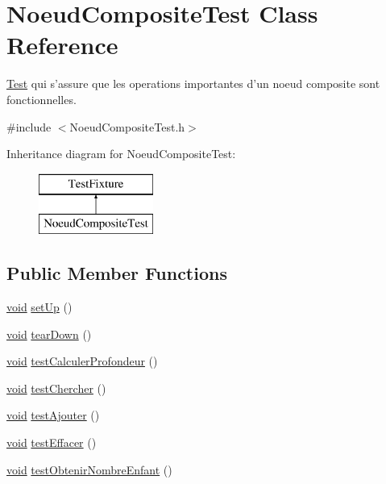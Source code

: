 \hypertarget{class_noeud_composite_test}{\section{Noeud\-Composite\-Test Class Reference}
\label{class_noeud_composite_test}
}


\hyperlink{class_test}{Test} qui s'assure que les operations importantes d'un noeud composite sont fonctionnelles.  




{\ttfamily \#include $<$Noeud\-Composite\-Test.\-h$>$}

Inheritance diagram for Noeud\-Composite\-Test\-:\begin{figure}[H]
\begin{center}
\leavevmode
\includegraphics[height=2.000000cm]{class_noeud_composite_test}
\end{center}
\end{figure}
\subsection*{Public Member Functions}
\begin{DoxyCompactItemize}
\item 
\hyperlink{wglew_8h_aeea6e3dfae3acf232096f57d2d57f084}{void} \hyperlink{group__inf2990_gac580ba74910c8d4e8476ce2f4e1930a2}{set\-Up} ()
\item 
\hyperlink{wglew_8h_aeea6e3dfae3acf232096f57d2d57f084}{void} \hyperlink{group__inf2990_gaab8590913d1e0ce48d52ca2875c12c92}{tear\-Down} ()
\item 
\hyperlink{wglew_8h_aeea6e3dfae3acf232096f57d2d57f084}{void} \hyperlink{group__inf2990_ga1b1070558ee915655b38348147c96f11}{test\-Calculer\-Profondeur} ()
\item 
\hyperlink{wglew_8h_aeea6e3dfae3acf232096f57d2d57f084}{void} \hyperlink{group__inf2990_ga684b84f99cf5a559386a96b8c4468683}{test\-Chercher} ()
\item 
\hyperlink{wglew_8h_aeea6e3dfae3acf232096f57d2d57f084}{void} \hyperlink{group__inf2990_gaaeb7bf3f97cb196df2398cdf1a639469}{test\-Ajouter} ()
\item 
\hyperlink{wglew_8h_aeea6e3dfae3acf232096f57d2d57f084}{void} \hyperlink{group__inf2990_ga2f7f5a6ba30a148469a30a8c32a8690c}{test\-Effacer} ()
\item 
\hyperlink{wglew_8h_aeea6e3dfae3acf232096f57d2d57f084}{void} \hyperlink{group__inf2990_ga756e97f908890526dfe10d4d6a907bec}{test\-Obtenir\-Nombre\-Enfant} ()
\end{DoxyCompactItemize}


